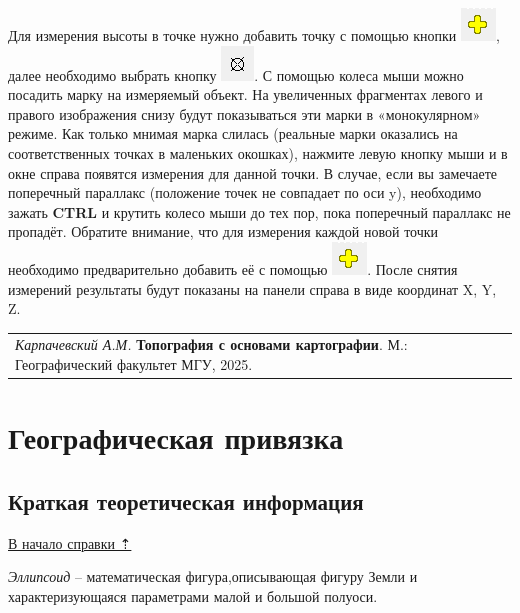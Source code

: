 \documentclass[
  12pt,
]{book}
\begin{document}
Для измерения высоты в точке нужно добавить точку с помощью кнопки \includegraphics{images/stereo/Add_Point.png}, далее необходимо выбрать кнопку \includegraphics{images/stereo/Measure.png}. С помощью колеса мыши можно посадить марку на измеряемый объект. На увеличенных фрагментах левого и правого изображения снизу будут показываться эти марки в «монокулярном» режиме. Как только мнимая марка слилась (реальные марки оказались на соответственных точках в маленьких окошках), нажмите левую кнопку мыши и в окне справа появятся измерения для данной точки. В случае, если вы замечаете поперечный параллакс (положение точек не совпадает по оси y), необходимо зажать \textbf{CTRL} и крутить колесо мыши до тех пор, пока поперечный параллакс не пропадёт. Обратите внимание, что для измерения каждой новой точки необходимо предварительно добавить её с помощью \includegraphics{images/stereo/Add_Point.png}. После снятия измерений результаты будут показаны на панели справа в виде координат X, Y, Z.

\begin{longtable}[]{@{}l@{}}
\toprule\noalign{}
\endhead
\bottomrule\noalign{}
\endlastfoot
\emph{Карпачевский А.М.} \textbf{Топография с основами картографии}. М.: Географический факультет МГУ, 2025. \\
\end{longtable}

\chapter{Географическая привязка}\label{georeference}

\section{Краткая теоретическая информация}\label{georeference-theory}

\hyperref[georeference]{В начало справки ⇡}

\emph{Эллипсоид} -- математическая фигура,описывающая фигуру Земли и характеризующаяся параметрами малой и большой полуоси.
\end{document}
